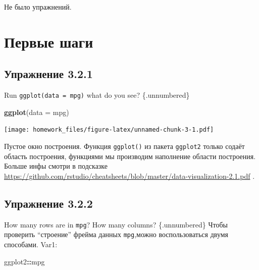 \documentclass[]{book}
\newenvironment{Shaded}{\begin{snugshade}}{\end{snugshade}}
\newcommand{\KeywordTok}[1]{\textcolor[rgb]{0.13,0.29,0.53}{\textbf{#1}}}
\newcommand{\DataTypeTok}[1]{\textcolor[rgb]{0.13,0.29,0.53}{#1}}
\newcommand{\OperatorTok}[1]{\textcolor[rgb]{0.81,0.36,0.00}{\textbf{#1}}}
\newcommand{\NormalTok}[1]{#1}
\begin{document}
Не было упражнений.

\section{Первые шаги}\label{-}

\subsection*{Упражнение 3.2.1}\label{-3.2.1}

Run \texttt{ggplot(data\ =\ mpg)} what do you see? \{.unnumbered\}

\begin{Shaded}
\begin{Highlighting}[]
\KeywordTok{ggplot}\NormalTok{(}\DataTypeTok{data =}\NormalTok{ mpg)}
\end{Highlighting}
\end{Shaded}

\texttt{[image: homework\_files/figure-latex/unnamed-chunk-3-1.pdf]}

Пустое окно построения. Функция \texttt{ggplot()} из пакета
\texttt{ggplot2} только содаёт область построения, функциями мы
производим наполнение области построения. Больше инфы смотри в подсказке
\url{https://github.com/rstudio/cheatsheets/blob/master/data-visualization-2.1.pdf}
.

\subsection*{Упражнение 3.2.2}\label{-3.2.2}

How many rows are in \texttt{mpg}? How many columns? \{.unnumbered\}
Чтобы проверить ``строение'' фрейма данных \texttt{mpg},можно
воспользоваться двумя способами. Var1:

\begin{Shaded}
\begin{Highlighting}[]
\NormalTok{ggplot2}\OperatorTok{::}\NormalTok{mpg}
\end{Highlighting}
\end{Shaded}
\end{document}
